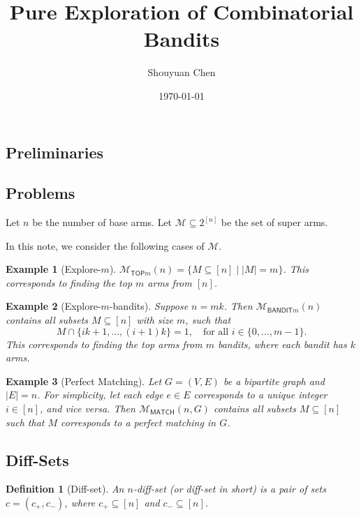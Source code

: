 \documentclass{article}
\title{Pure Exploration of Combinatorial Bandits}
\author{Shouyuan Chen}
\date{\today}
\newtheorem{define}{Definition}
\newtheorem{example}{Example}
\newcommand{\M}{\mathcal M}
\newcommand{\mmatch}{\mathcal M_{\mathsf{MATCH}}}
\newcommand{\mtop}{\mathcal M_{\mathsf{TOP}m}}
\newcommand{\mbandit}{\mathcal M_{\mathsf{BANDIT}m}}
\begin{document}
\begin{spacing}{1.1}
\newpage

\maketitle

\section{Preliminaries}

\subsection{Problems}

Let $n$ be the number of base arms. 
Let $\M \subseteq 2^{[n]}$ be the set of super arms. 


In this note, we consider the following cases of $\M$.

\begin{example}[Explore-$m$]
$\mtop(n)=\{M \subseteq [n] \;|\; |M|=m\}$.
This corresponds to finding the top $m$ arms from $[n]$.
\end{example}

\begin{example}[Explore-$m$-bandits]
Suppose $n=mk$. Then $\mbandit(n)$ contains all subsets $M \subseteq [n]$ with size $m$, such that 
$$ 
M\cap \{ik+1,\ldots, (i+1)k\} = 1, \quad \text{for all } i \in \{0,\ldots, m-1\}.
$$ 
This corresponds to finding the top arms from $m$ bandits, where each bandit has $k$ arms.
\end{example}

\begin{example}[Perfect Matching]
Let $G=(V,E)$ be a bipartite graph and $|E|=n$. 
For simplicity, let each edge $e\in E$ corresponds to a unique integer $i\in [n]$, and vice versa. 
Then $\mmatch(n,G)$ contains all subsets $M \subseteq [n]$ such that $M$ corresponds to a perfect matching in $G$.
\end{example}


\subsection{Diff-Sets}

\begin{define}[Diff-set]
An $n$-diff-set (or diff-set in short) is a pair of sets $c=(c_+,c_-)$, where $c_+\subseteq[n]$ and $c_-\subseteq [n]$.
\end{define}



\end{spacing}
\end{document}
